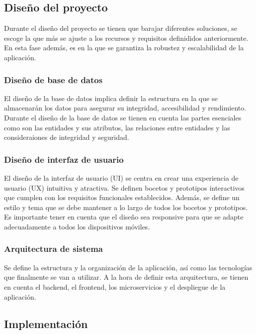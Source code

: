 \documentclass[a4paper, 12pt]{article}
\begin{document}
\subsection{Diseño del proyecto}

Durante el diseño del proyecto se tienen que barajar diferentes soluciones, se escoge la que más se ajuste a los recursos y requisitos definididos anteriormente. En esta fase además, es en la que se garantiza la robustez y escalabilidad de la aplicación.

\subsubsection{Diseño de base de datos}

El diseño de la base de datos implica definir la estructura en la que se almacenarán los datos para asegurar su integridad, accesibilidad y rendimiento. Durante el diseño de la base de datos se tienen en cuenta las partes esenciales como son las entidades y sus atributos, las relaciones entre entidades y las consideraiones de integridad y seguridad.

\subsubsection{Diseño de interfaz de usuario}

El diseño de la interfaz de usuario (UI) se centra en crear una experiencia de usuario (UX) intuitiva y atractiva. Se definen bocetos y prototipos interactivos que cumplen con los requisitos funcionales establecidos. Además, se define un estilo y tema que se debe mantener a lo largo de todos los bocetos y prototipos. Es importante tener en cuenta que el diseño sea responsive para que se adapte adecuadamente a todos los dispositivos móviles.

\subsubsection{Arquitectura de sistema}

Se define la estructura y la organización de la aplicación, así como las tecnologías que finalmente se van a utilizar. A la hora de definir esta arquitectura, se tienen en cuenta el backend, el frontend, los microservicios y el despliegue de la aplicación.

\subsection{Implementación}
\end{document}
